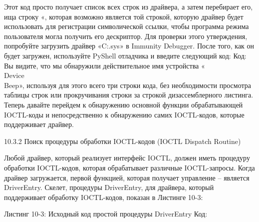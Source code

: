 \documentclass[12pt, a4paper, oneside]{book}
\begin{document}




Этот код просто получает список всех строк из драйвера, а затем перебирает его, ища строку «\Device\», которая возможно является той строкой, которую драйвер будет использовать для регистрации символической ссылки, чтобы программа режима пользователя могла получить его дескриптор. Для проверки этого утверждения, попробуйте загрузить драйвер «C:\WINDOWS{}\beep.sys» в Immunity Debugger. После того, как он будет загружен, используйте PyShell отладчика и введите следующий код:
Код:
Вы видите, что мы обнаружили действительное имя устройства «\\Device\\Beep», используя для этого всего три строки кода, без необходимости просмотра таблицы строк или прокручивания строки за строкой дизассемблерного листинга. Теперь давайте перейдем к обнаружению основной функции обрабатывающей IOCTL-коды и непосредственно к обнаружению самих IOCTL-кодов, которые поддерживает драйвер. 

10.3.2 Поиск процедуры обработки IOCTL-кодов (IOCTL Dispatch Routine)

Любой драйвер, который реализует интерфейс IOCTL, должен иметь процедуру обработки IOCTL-кодов, которая обрабатывает различные IOCTL-запросы. Когда драйвер загружается, первой функцией, которая получает управление – является DriverEntry. Скелет, процедуры DriverEntry, для драйвера, который поддерживает обработку IOCTL-кодов, показан в Листинге 10-3:

Листинг 10-3: Исходный код простой процедуры DriverEntry
Код:
\end{document}
